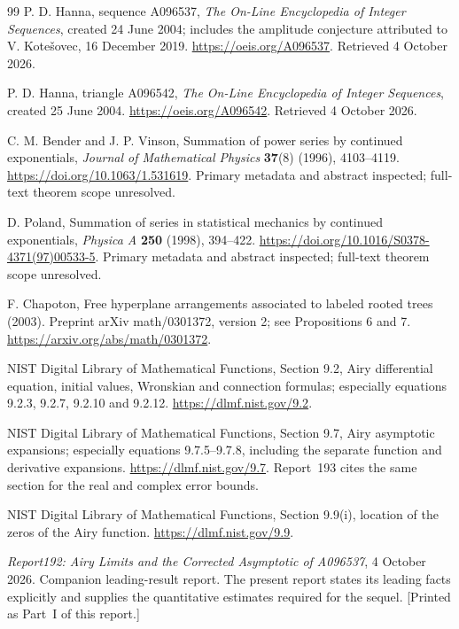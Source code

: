 \documentclass[11pt]{article}
\theoremstyle{remark}\newtheorem{remark}[theorem]{Remark}
\begin{document}
\clearpage
\begin{thebibliography}{99}
P. D. Hanna, sequence A096537, \emph{The On-Line Encyclopedia of Integer
Sequences}, created 24 June 2004; includes the amplitude conjecture attributed
to V. Kote\v{s}ovec, 16 December 2019.
\url{https://oeis.org/A096537}. Retrieved 4 October 2026.

P. D. Hanna, triangle A096542, \emph{The On-Line Encyclopedia of Integer
Sequences}, created 25 June 2004.
\url{https://oeis.org/A096542}. Retrieved 4 October 2026.

C. M. Bender and J. P. Vinson, Summation of power series by continued
exponentials, \emph{Journal of Mathematical Physics} \textbf{37}(8) (1996),
4103--4119. \url{https://doi.org/10.1063/1.531619}.
Primary metadata and abstract inspected; full-text theorem scope unresolved.

D. Poland, Summation of series in statistical mechanics by continued
exponentials, \emph{Physica A} \textbf{250} (1998), 394--422.
\url{https://doi.org/10.1016/S0378-4371(97)00533-5}.
Primary metadata and abstract inspected; full-text theorem scope unresolved.

F. Chapoton, Free hyperplane arrangements associated to labeled rooted trees
(2003). Preprint arXiv math/0301372, version 2; see Propositions 6 and 7.
\url{https://arxiv.org/abs/math/0301372}.

NIST Digital Library of Mathematical Functions, Section 9.2,
Airy differential equation, initial values, Wronskian and connection formulas;
especially equations 9.2.3, 9.2.7, 9.2.10 and 9.2.12.
\url{https://dlmf.nist.gov/9.2}.

NIST Digital Library of Mathematical Functions, Section 9.7,
Airy asymptotic expansions; especially equations 9.7.5--9.7.8, including
the separate function and derivative expansions.
\url{https://dlmf.nist.gov/9.7}.
Report~193 cites the same section for the real and complex error bounds.

NIST Digital Library of Mathematical Functions, Section 9.9(i),
location of the zeros of the Airy function.
\url{https://dlmf.nist.gov/9.9}.

\emph{Report192: Airy Limits and the Corrected Asymptotic of A096537},
4 October 2026. Companion leading-result report.
The present report states its leading facts explicitly and supplies the
quantitative estimates required for the sequel.
[Printed as Part~I of this report.]


\end{thebibliography}
\end{document}
